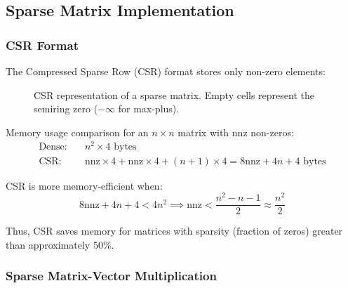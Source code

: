 \documentclass[11pt,a4paper]{article}
\theoremstyle{plain}
\theoremstyle{definition}
\newcommand{\nnz}{\mathrm{nnz}}
\newcommand{\mat}[1]{\mathbf{#1}}
\begin{document}
\subsection{Sparse Matrix Implementation}
\label{subsec:sparse}

\subsubsection{CSR Format}

The Compressed Sparse Row (CSR) format stores only non-zero elements:

\begin{figure}[htbp]
\centering
{}
\caption{CSR representation of a sparse matrix. Empty cells represent the semiring zero ($-\infty$ for max-plus).}
\label{fig:csr}
\end{figure}

Memory usage comparison for an $n \times n$ matrix with $\nnz$ non-zeros:
\begin{align}
    \text{Dense:} \quad & n^2 \times 4 \text{ bytes} \\
    \text{CSR:} \quad & \nnz \times 4 + \nnz \times 4 + (n+1) \times 4 = 8\nnz + 4n + 4 \text{ bytes}
\end{align}

CSR is more memory-efficient when:
\begin{equation}
    8\nnz + 4n + 4 < 4n^2 \implies \nnz < \frac{n^2 - n - 1}{2} \approx \frac{n^2}{2}
\end{equation}

Thus, CSR saves memory for matrices with sparsity (fraction of zeros) greater than approximately 50\%.

\subsubsection{Sparse Matrix-Vector Multiplication}
\end{document}
